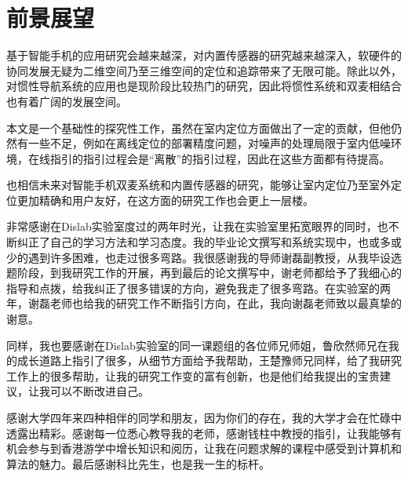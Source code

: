 \documentclass[winfonts,oneside]{njuthesis}
\begin{document}
	\section{前景展望}
	
		基于智能手机的应用研究会越来越深，对内置传感器的研究越来越深入，软硬件的协同发展无疑为二维空间乃至三维空间的定位和追踪带来了无限可能。除此以外，对惯性导航系统的应用也是现阶段比较热门的研究，因此将惯性系统和双麦相结合也有着广阔的发展空间。
		
		本文是一个基础性的探究性工作，虽然在室内定位方面做出了一定的贡献，但他仍然有一些不足，例如在离线定位的部署精度问题，对噪声的处理局限于室内低噪环境，在线指引的指引过程会是“离散”的指引过程，因此在这些方面都有待提高。
		
		也相信未来对智能手机双麦系统和内置传感器的研究，能够让室内定位乃至室外定位更加精确和用户友好，在这方面的研究工作也会更上一层楼。
	
	

	\begin{acknowledgement}
		
		非常感谢在Dislab实验室度过的两年时光，让我在实验室里拓宽眼界的同时，也不断纠正了自己的学习方法和学习态度。我的毕业论文撰写和系统实现中，也或多或少的遇到许多困难，也走过很多弯路。我很感谢我的导师谢磊副教授，从我毕设选题阶段，到我研究工作的开展，再到最后的论文撰写中，谢老师都给予了我细心的指导和点拨，给我纠正了很多错误的方向，避免我走了很多弯路。在实验室的两年，谢磊老师也给我的研究工作不断指引方向，在此，我向谢磊老师致以最真挚的谢意。
		
		同样，我也要感谢在Dislab实验室的同一课题组的各位师兄师姐，鲁欣然师兄在我的成长道路上指引了很多，从细节方面给予我帮助，王楚豫师兄同样，给了我研究工作上的很多帮助，让我的研究工作变的富有创新，也是他们给我提出的宝贵建议，让我可以不断改进自己。
		
		感谢大学四年来四种相伴的同学和朋友，因为你们的存在，我的大学才会在忙碌中透露出精彩。感谢每一位悉心教导我的老师，感谢钱柱中教授的指引，让我能够有机会参与到香港游学中增长知识和阅历，让我在问题求解的课程中感受到计算机和算法的魅力。最后感谢科比先生，也是我一生的标杆。
		
	\end{acknowledgement}
\end{document}
